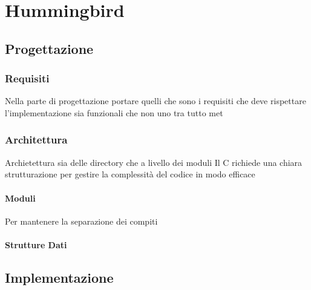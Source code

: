 
\chapter{Hummingbird} %

\label{ChapterX} %


\section{Progettazione}

\subsection{Requisiti}

Nella parte di progettazione portare quelli che sono i requisiti che deve rispettare l'implementazione
sia funzionali che non
uno tra tutto met

\subsection{Architettura}

Archietettura sia delle directory che a livello dei moduli 
Il C richiede una chiara strutturazione per gestire la complessità del codice in modo efficace

\subsubsection*{Moduli}

Per mantenere la separazione dei compiti

\subsubsection*{Strutture Dati}

\section{Implementazione}

